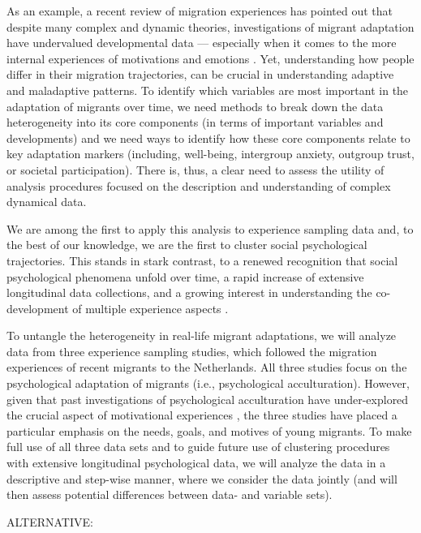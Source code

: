 \documentclass[man, 12pt, a4paper]{apa7}
\theoremstyle{break}
\theoremstyle{plain}
\begin{document}
As an example, a recent review of migration experiences has pointed out that despite many complex and dynamic theories, investigations of migrant adaptation have undervalued developmental data --- especially when it comes to the more internal experiences of motivations and emotions \citep[e.g.,][]{Kreienkamp2022d}. Yet, understanding how people differ in their migration trajectories, can be crucial in understanding adaptive and maladaptive patterns. To identify which variables are most important in the adaptation of migrants over time, we need methods to break down the data heterogeneity into its core components (in terms of important variables and developments) and we need ways to identify how these core components relate to key adaptation markers (including, well-being, intergroup anxiety, outgroup trust, or societal participation). There is, thus, a clear need to assess the utility of analysis procedures focused on the description and understanding of complex dynamical data. 

We are among the first to apply this analysis to experience sampling data and, to the best of our knowledge, we are the first to cluster social psychological trajectories. This stands in stark contrast, to a renewed recognition that social psychological phenomena unfold over time, a rapid increase of extensive longitudinal data collections, and a growing interest in understanding the co-development of multiple experience aspects \citep[e.g.,][]{Kreienkamp2022d, MacInnis2015, McKeown2017, Pettigrew2011, Ward2019}. 

To untangle the heterogeneity in real-life migrant adaptations, we will analyze data from three experience sampling studies, which followed the migration experiences of recent migrants to the Netherlands. All three studies focus on the psychological adaptation of migrants (i.e., psychological acculturation). However, given that past investigations of psychological acculturation have under-explored the crucial aspect of motivational experiences \citep[e.g.,][]{Kreienkamp2022d}, the three studies have placed a particular emphasis on the needs, goals, and motives of young migrants. To make full use of all three data sets and to guide future use of clustering procedures with extensive longitudinal psychological data, we will analyze the data in a descriptive and step-wise manner, where we consider the data jointly (and will then assess potential differences between data- and variable sets). 


ALTERNATIVE:
\end{document}
